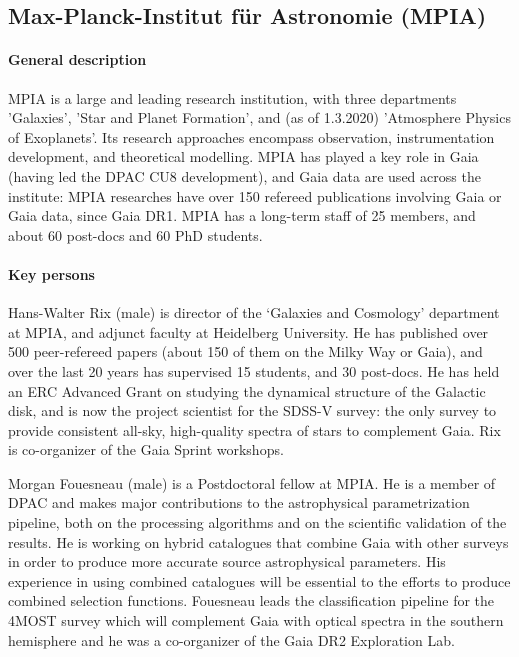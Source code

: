 \subsection{Max-Planck-Institut f\"ur Astronomie (MPIA)}
\label{sec:mpg}

\paragraph{General description}
MPIA is a large and leading research institution, with three departments 'Galaxies', 'Star and Planet Formation', and (as of 1.3.2020) 'Atmosphere Physics of Exoplanets'. Its research approaches encompass observation, instrumentation development, and theoretical modelling. MPIA has played a key role in Gaia (having led the DPAC CU8 development), and Gaia data are used across the institute: MPIA researches have over 150 refereed publications involving Gaia or Gaia data, since Gaia DR1. MPIA has a long-term staff of 25 members, and about 60 post-docs and 60 PhD students.

\paragraph{Key persons} 
Hans-Walter Rix (male) is director of the `Galaxies and Cosmology' department at MPIA, and adjunct faculty at Heidelberg University. He has published over 500 peer-refereed papers (about 150 of them on the Milky Way or Gaia), and over the last 20 years has supervised 15 students, and 30 post-docs. He has held an ERC Advanced Grant on studying the dynamical structure of the Galactic disk, and is now the project scientist for the SDSS-V survey: the only survey to provide consistent all-sky, high-quality spectra of stars to complement Gaia. Rix is co-organizer of the Gaia Sprint workshops.

Morgan Fouesneau (male) is a Postdoctoral fellow at MPIA. He is a member of DPAC and makes major contributions to the astrophysical parametrization pipeline, both on the processing algorithms and on the scientific validation of the results. He is working on hybrid catalogues that combine Gaia with other surveys in order to produce more accurate source astrophysical parameters. His experience in using combined catalogues will be essential to the efforts to produce combined selection functions. Fouesneau leads the classification pipeline for the 4MOST survey which will complement Gaia with optical spectra in the southern hemisphere and he was a co-organizer of the Gaia DR2 Exploration Lab.

